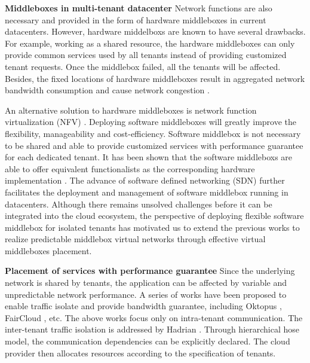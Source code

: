 \documentclass[review]{elsarticle}
\begin{document}
\textbf{Middleboxes in multi-tenant datacenter }
Network functions are also necessary and provided in the form of hardware middleboxes in current datacenters.  However, hardware middelboxs are known to have several drawbacks. For example, working as a shared resource, the hardware middleboxes can only provide common services used by all tenants instead of providing customized tenant requests. Once the middlebox failed, all the tenants will be affected. Besides, the fixed locations of hardware middleboxes result in aggregated network bandwidth consumption and cause network congestion \cite{ClickOS, Y15NFV}. 

An alternative solution to hardware middleboxes is network function virtualization (NFV) \cite{NFV}. Deploying software middleboxes will greatly improve the flexibility, manageability and cost-efficiency. Software middlebox is not necessary to be shared and able to provide customized services with performance guarantee for each dedicated tenant. It has been shown that the software middleboxs are able to offer equivalent functionalists as the corresponding hardware implementation \cite{D12tpp, S12dai, G13dio, ClickOS}. The advance of software defined networking (SDN) further facilitates the deployment and management of software middlebox running in datacenters. Although there remains unsolved challenges before it can be integrated into the cloud ecosystem, the perspective of deploying flexible software middlebox for isolated tenants has motivated us to extend the previous works to realize predictable middlebox virtual networks through effective virtual middleboxes placement.


\textbf{Placement of services with performance guarantee}
Since the underlying network is shared by tenants, the application can be affected by variable and unpredictable network performance. A series of works have been proposed to enable traffic isolate and provide bandwidth guarantee, including Oktopus \cite{B11tpd}, FairCloud \cite{P12fst}, etc. The above works focus only on intra-tenant communication. The inter-tenant traffic isolation is addressed by Hadrian \cite{B13cta}. Through hierarchical hose model, the communication dependencies can be explicitly declared. The cloud provider then allocates resources according to the specification of tenants. 
\end{document}
